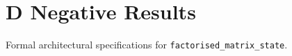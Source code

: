 \section{D Negative Results}

Formal architectural specifications for \texttt{factorised_matrix_state}.
